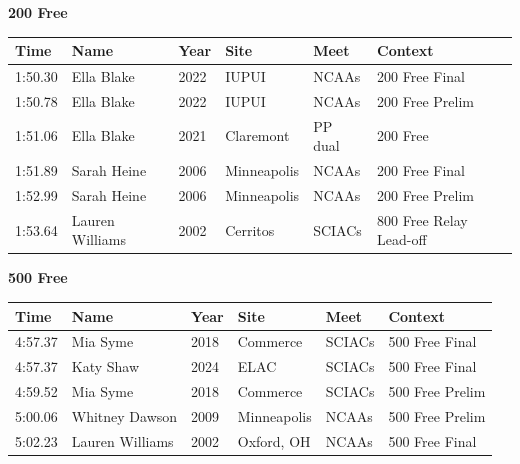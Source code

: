 \noindent\begin{minipage}[t]{0.98\textwidth}
\centering
\textbf{\textcolor{teamprimary}{200 Free}}\par
\vspace{0.5em}
\centering
\small
\renewcommand{\arraystretch}{1.0}
\setlength{\tabcolsep}{4pt}
\begin{tabular}{@{}p{2.0cm}p{3.2cm}p{1.2cm}p{2.0cm}p{2.0cm}p{2.5cm}@{}}
\toprule
\textbf{Time} & \textbf{Name} & \textbf{Year} & \textbf{Site} & \textbf{Meet} & \textbf{Context} \\
\midrule
1:50.30 & Ella Blake & 2022 & IUPUI & NCAAs & 200 Free Final \\
1:50.78 & Ella Blake & 2022 & IUPUI & NCAAs & 200 Free Prelim \\
1:51.06 & Ella Blake & 2021 & Claremont & PP dual & 200 Free \\
1:51.89 & Sarah Heine & 2006 & Minneapolis & NCAAs & 200 Free Final \\
1:52.99 & Sarah Heine & 2006 & Minneapolis & NCAAs & 200 Free Prelim \\
1:53.64 & Lauren Williams & 2002 & Cerritos & SCIACs & 800 Free Relay Lead-off \\
\bottomrule
\end{tabular}
\end{minipage}
\vspace{1.2em}
\noindent\begin{minipage}[t]{0.98\textwidth}
\centering
\textbf{\textcolor{teamprimary}{500 Free}}\par
\vspace{0.5em}
\centering
\small
\renewcommand{\arraystretch}{1.0}
\setlength{\tabcolsep}{4pt}
\begin{tabular}{@{}p{2.0cm}p{3.2cm}p{1.2cm}p{2.0cm}p{2.0cm}p{2.5cm}@{}}
\toprule
\textbf{Time} & \textbf{Name} & \textbf{Year} & \textbf{Site} & \textbf{Meet} & \textbf{Context} \\
\midrule
4:57.37 & Mia Syme & 2018 & Commerce & SCIACs & 500 Free Final \\
4:57.37 & Katy Shaw & 2024 & ELAC & SCIACs & 500 Free Final \\
4:59.52 & Mia Syme & 2018 & Commerce & SCIACs & 500 Free Prelim \\
5:00.06 & Whitney Dawson & 2009 & Minneapolis & NCAAs & 500 Free Prelim \\
5:02.23 & Lauren Williams & 2002 & Oxford, OH & NCAAs & 500 Free Final \\
\bottomrule
\end{tabular}
\end{minipage}
